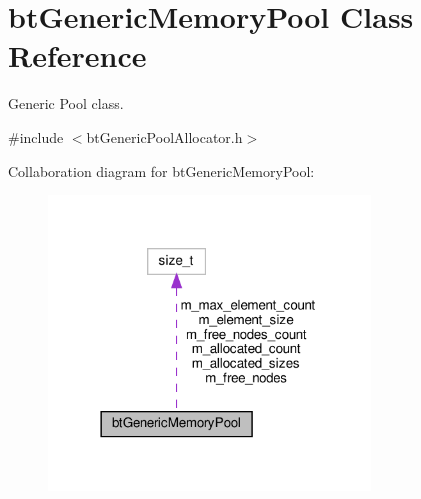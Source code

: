 \hypertarget{classbtGenericMemoryPool}{}\section{bt\+Generic\+Memory\+Pool Class Reference}
\label{classbtGenericMemoryPool}


Generic Pool class.  




{\ttfamily \#include $<$bt\+Generic\+Pool\+Allocator.\+h$>$}



Collaboration diagram for bt\+Generic\+Memory\+Pool\+:
\nopagebreak
\begin{figure}[H]
\begin{center}
\leavevmode
\includegraphics[width=242pt]{classbtGenericMemoryPool__coll__graph}
\end{center}
\end{figure}
